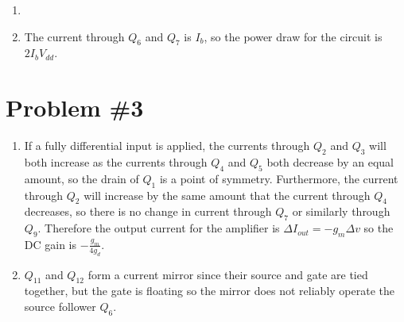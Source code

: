 \documentclass{article}
\begin{document}
\begin{enumerate}
{\begin{circuitikz}
  (q1.source) -- ++(0,0) node[sground] {}
  (q1.gate)   -- (q8.gate)

  (q8.source) -- ++(0,0) node[sground] {}
  (q8.gate)   node[circ] {} |- (q8.drain) node[circ] {}

  (q7.drain)  to[I, i=$I_b$] (q8.drain)
  (q7.source) -- ++(0,0) node[rground, yscale=-1] {}
  (q7.gate)   node[circ] {} |- (q7.drain) node[circ] {}

  (q6.source) -- ++(0,0) node[rground, yscale=-1] {}
  (q6.gate) -- (q7.gate)
;\end{circuitikz}

A fully differential input to this amplifier will cause no change in the 
current through $Q_1$, and thus no change in the voltage at the source of
the input stage transistors. Therefore this is a point of symmetry. As
$V_{in}^{+}$ increases by $\Delta v$ and $V_{in}^{-}$ decreases by 
$\Delta v$, the current through $Q_2$ increases by $g_m \Delta v$ and the
current through $Q_3$ (as reflected by the current mirror $Q_5$) decreases
by $g_m \Delta v$. Therefore the change in output current is 
$-g_m \Delta v - g_m \Delta v = -2 g_m \Delta v$. The output resistance is
the drain resistance $\frac{1}{g_d}$ of $Q_2$ in parallel with the drain
resistance $\frac{1}{g_d}$ of $Q_3$ and is thus about $\frac{1}{2g_d}$, so
the DC gain is
$$
A_v = \frac{-2 \frac{g_m}{g_d} \Delta v}{2 \Delta v} = -\frac{g_m}{g_d}.
$$ 
}
\item
{
}
\item
{
The current through $Q_6$ and $Q_7$ is $I_b$, so the power draw for the circuit
is $2 I_b V_{dd}$.
}
\end{enumerate}



\section*{Problem \#3}
\begin{enumerate}
\item{
If a fully differential input is applied, the currents through $Q_2$ and
$Q_3$ will both increase as the currents through $Q_4$ and $Q_5$ both 
decrease by an equal amount, so the drain of $Q_1$ is a point of symmetry.
Furthermore, the current through $Q_2$ will increase by the same amount 
that the current through $Q_4$ decreases, so there is no change in 
current through $Q_7$ or similarly through $Q_9$. Therefore the 
output current for the amplifier is $\Delta I_{out} = -g_m \Delta v$
so the DC gain is $-\frac{g_m}{4 g_d}$.
}
\item{
$Q_{11}$ and $Q_{12}$ form a current mirror since their source and gate are 
tied together, but the gate is floating so the mirror does not reliably 
operate the source follower $Q_6$.

}
\end{enumerate}
\end{document}

